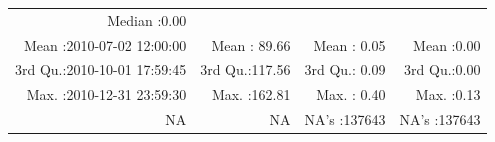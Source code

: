 \documentclass[
  10pt,
  a4paper,oneside]{article}
\begin{document}
\begin{longtable}[]{@{}rrrr@{}}
\begin{minipage}[t]{0.18\columnwidth}
Median :0.00\strut
\end{minipage}\tabularnewline
\begin{minipage}[t]{0.34\columnwidth}\raggedleft
Mean :2010-07-02 12:00:00\strut
\end{minipage} & \begin{minipage}[t]{0.19\columnwidth}\raggedleft
Mean : 89.66\strut
\end{minipage} & \begin{minipage}[t]{0.18\columnwidth}\raggedleft
Mean : 0.05\strut
\end{minipage} & \begin{minipage}[t]{0.18\columnwidth}\raggedleft
Mean :0.00\strut
\end{minipage}\tabularnewline
\begin{minipage}[t]{0.34\columnwidth}\raggedleft
3rd Qu.:2010-10-01 17:59:45\strut
\end{minipage} & \begin{minipage}[t]{0.19\columnwidth}\raggedleft
3rd Qu.:117.56\strut
\end{minipage} & \begin{minipage}[t]{0.18\columnwidth}\raggedleft
3rd Qu.: 0.09\strut
\end{minipage} & \begin{minipage}[t]{0.18\columnwidth}\raggedleft
3rd Qu.:0.00\strut
\end{minipage}\tabularnewline
\begin{minipage}[t]{0.34\columnwidth}\raggedleft
Max. :2010-12-31 23:59:30\strut
\end{minipage} & \begin{minipage}[t]{0.19\columnwidth}\raggedleft
Max. :162.81\strut
\end{minipage} & \begin{minipage}[t]{0.18\columnwidth}\raggedleft
Max. : 0.40\strut
\end{minipage} & \begin{minipage}[t]{0.18\columnwidth}\raggedleft
Max. :0.13\strut
\end{minipage}\tabularnewline
\begin{minipage}[t]{0.34\columnwidth}\raggedleft
NA\strut
\end{minipage} & \begin{minipage}[t]{0.19\columnwidth}\raggedleft
NA\strut
\end{minipage} & \begin{minipage}[t]{0.18\columnwidth}\raggedleft
NA's :137643\strut
\end{minipage} & \begin{minipage}[t]{0.18\columnwidth}\raggedleft
NA's :137643\strut
\end{minipage}\tabularnewline
\bottomrule
\end{longtable}
\end{document}
